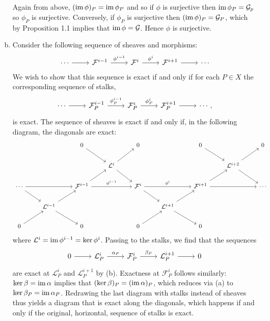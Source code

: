 \documentclass{mathnotes}
\begin{document}
\begin{enumerate}[(a)]
        Again from above, $(\operatorname{im}\phi)_P=\operatorname{im}\phi_P$ and so if $\phi$ is surjective then $\operatorname{im}\phi_P=\mathcal{G}_p$ 
        so $\phi_P$ is surjective. Conversely, if $\phi_P$ is surjective then $(\operatorname{im}\phi)_P=\mathcal{G}_P$, which
        by Proposition 1.1 implies that $\operatorname{im}\phi=\mathcal{G}$. Hence $\phi$ is surjective.
    \item Consider the following sequence of sheaves and morphisms:
        \begin{equation*}
            \begin{tikzcd}
                \cdots\ar{r} & \mathcal{F}^{i-1}\ar{r}{\phi^{i-1}} & \mathcal{F}^i\ar{r}{\phi^i} & \mathcal{F}^{i+1}\ar{r} & \cdots
            \end{tikzcd}
        \end{equation*}
        We wish to show that this sequence is exact if and only if for each $P\in X$ the corresponding sequence of stalks,
        \begin{equation*}
            \begin{tikzcd}
                \cdots\ar{r} & \mathcal{F}^{i-1}_P\ar{r}{\phi^{i-1}_P} & \mathcal{F}_P^i\ar{r}{\phi^i_P} & \mathcal{F}^{i+1}_P\ar{r} & \cdots,
            \end{tikzcd}
        \end{equation*}
        is exact. The sequence of sheaves is exact if and only if, in the following diagram, the diagonals are exact:
        \begin{equation*}
            \begin{tikzcd}
                \;&&0\ar{rd}&&0&&0\ar{rd}&&0\\
                \;&&&\mathcal{L}^i\ar{rd}\ar{ru}&&&&\mathcal{L}^{i+2}\ar{ru}\ar{rd}\\
                \cdots\ar{rd}\ar{rr} && \mathcal{F}^{i-1}\ar{rr}{\phi^{i-1}}\ar{ru} && \mathcal{F}^i\ar{rr}{\phi^i}\ar{rd} && \mathcal{F}^{i+1}\ar{rr}\ar{ru} && \cdots\\
                \;&\mathcal{L}^{i-1}\ar{ru}\ar{rd}&&&&\mathcal{L}^{i+1}\ar{ru}\ar{rd}\\
                0\ar{ru}&&0&&0\ar{ru}&&0
            \end{tikzcd}
        \end{equation*}
        where $\mathcal{L}^i=\operatorname{im}\phi^{i-1}=\ker\phi^i$. Passing to the stalks, we find that the sequences
        \begin{equation*}
            \begin{tikzcd}
                0\ar{r} & \mathcal{L}^{i}_P\ar{r}{\alpha_P} & \mathcal{F}_P^i\ar{r}{\beta_P} & \mathcal{L}^{i+1}_P\ar{r} & 0
            \end{tikzcd}
        \end{equation*}
        are exact at $\mathcal{L}^i_P$ and $\mathcal{L}^{i+1}_P$ by (b). Exactness at $\mathcal{F}_P^i$ follows similarly:
        $\ker\beta=\operatorname{im}\alpha$ implies that $(\ker\beta)_P=(\operatorname{im}\alpha)_P$, which reduces via (a) to $\ker\beta_P=\operatorname{im}\alpha_P$.
        Redrawing the last diagram with stalks instead of sheaves thus yields a diagram that is exact along the diagonals,
        which happens if and only if the original, horizontal, sequence of stalks is exact.
\end{enumerate}
\end{document}
